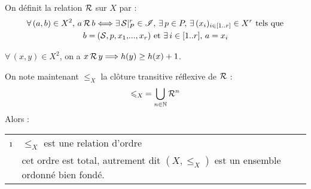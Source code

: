 			\eqskip{2mm}
			\begin{Notation}
				On définit la relation \(\cal{R}\) sur \(X\) par :
				\begin{align*}
					\forall\,(a,b)\in X^2, \, a\,\cal{R}\, b & \iff \exists\, \cal{S}\constr{r}{P}\in \scr{I}, \,\exists \,p \in P, \,\exists\,(x_i)_{i\in[1..r]} \in X^r \text{ tels que} \\
					b = &\:(\cal{S},p,x_1,\!...,x_r) \text{ et } \exists\, i\in[1..r], \, a=x_i
				\end{align*}
			\end{Notation}
			
			\begin{Remarque}
				\(\forall\,(x,y)\in X^2\), on a \(x \,\cal{R}\, y \Longrightarrow h(y) \geq h(x)+1\).
			\end{Remarque}
			
			\begin{Propriete}
				On note maintenant \(\leqslant_X\) la clôture transitive réflexive de \(\cal{R}\) :
					\[
						\displaystyle \leqslant_X \: = \bigcup_{n\in\bb{N}} \cal{R}^n
					\]
				Alors : \!\begin{tabular}[t]{cl}
					\i & \(\leqslant_X\) est une relation d'ordre \\
					\ii & cet ordre est total, autrement dit \((X,\leqslant_X)\) est un ensemble ordonné bien fondé.
				\end{tabular}
			\end{Propriete}
			
